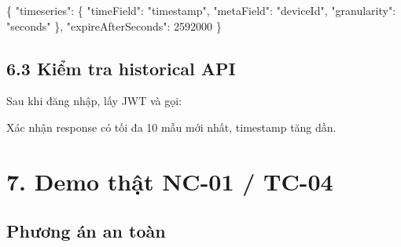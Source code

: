 \documentclass[11pt,oneside,openany]{book}
\newenvironment{Shaded}{\begin{snugshade}}{\end{snugshade}}
\newcommand{\DataTypeTok}[1]{\textcolor[rgb]{0.16,0.50,0.73}{#1}}
\newcommand{\DecValTok}[1]{\textcolor[rgb]{0.96,0.45,0.00}{#1}}
\newcommand{\FunctionTok}[1]{\textcolor[rgb]{0.56,0.27,0.68}{#1}}
\newcommand{\NormalTok}[1]{\textcolor[rgb]{0.81,0.81,0.76}{#1}}
\newcommand{\OperatorTok}[1]{\textcolor[rgb]{0.81,0.81,0.76}{#1}}
\newcommand{\StringTok}[1]{\textcolor[rgb]{0.96,0.31,0.31}{#1}}
\newcommand{\VariableTok}[1]{\textcolor[rgb]{0.15,0.68,0.68}{#1}}
\renewenvironment{Shaded}{%
  \def\FrameCommand{\fboxsep=8pt\colorbox{shadecolor}}%
  \MakeFramed{\advance\hsize-\width\FrameRestore}%
}{\endMakeFramed}
\begin{document}
\begin{Shaded}
\begin{Highlighting}[]
\FunctionTok{\{}
  \DataTypeTok{"timeseries"}\FunctionTok{:} \FunctionTok{\{}
    \DataTypeTok{"timeField"}\FunctionTok{:} \StringTok{"timestamp"}\FunctionTok{,}
    \DataTypeTok{"metaField"}\FunctionTok{:} \StringTok{"deviceId"}\FunctionTok{,}
    \DataTypeTok{"granularity"}\FunctionTok{:} \StringTok{"seconds"}
  \FunctionTok{\},}
  \DataTypeTok{"expireAfterSeconds"}\FunctionTok{:} \DecValTok{2592000}
\FunctionTok{\}}
\end{Highlighting}
\end{Shaded}

\subsection{6.3 Kiểm tra historical
API}\label{63-kiux1ec3m-tra-historical-api}

Sau khi đăng nhập, lấy JWT và gọi:

\begin{Shaded}
\end{Shaded}

Xác nhận response có tối đa 10 mẫu mới nhất, timestamp tăng dần.

\section{7. Demo thật NC-01 /
TC-04}\label{7-demo-thux1eadt-nc-01--tc-04}

\subsection{Phương án an toàn}\label{phux1b0ux1a1ng-uxe1n-an-touxe0n}
\end{document}

